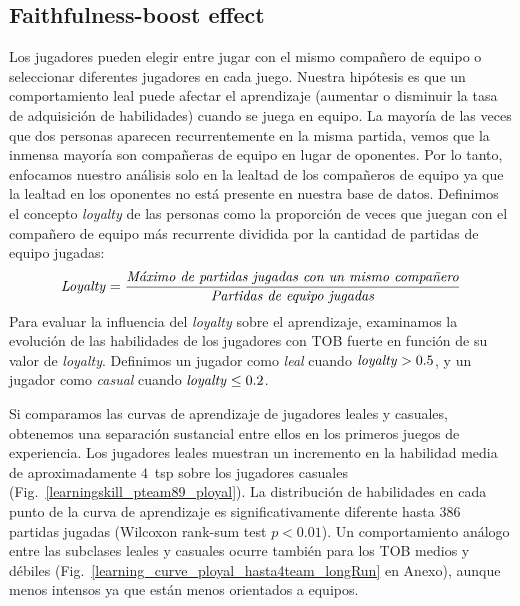 \documentclass[a4paper,11pt]{book}
\theoremstyle{definition}
\begin{document}
\subsection{Faithfulness-boost effect}

Los jugadores pueden elegir entre jugar con el mismo compa\~nero de equipo o seleccionar diferentes jugadores en cada juego.
%
Nuestra hip\'otesis es que un comportamiento leal puede afectar el aprendizaje (aumentar o disminuir la tasa de adquisici\'on de habilidades) cuando se juega en equipo.
%
La mayor\'ia de las veces que dos personas aparecen recurrentemente en la misma partida, vemos que la inmensa mayor\'ia son compa\~neras de equipo en lugar de oponentes.
%
Por lo tanto, enfocamos nuestro an\'alisis solo en la lealtad de los compa\~neros de equipo ya que la lealtad en los oponentes no est\'a presente en nuestra base de datos.
%
Definimos el concepto \emph{loyalty} de las personas como la proporci\'on de veces que juegan con el compa\~nero de equipo m\'as recurrente dividida por la cantidad de partidas de equipo jugadas:
%
\begin{equation}
\text{\emph{Loyalty}} = \frac{\text{\emph{M\'aximo de partidas jugadas con un mismo compa\~nero}}}{\text{\emph{Partidas de equipo jugadas}}}
\end{equation}
%
Para evaluar la influencia del \emph{loyalty} sobre el aprendizaje, examinamos la evoluci\'on de las habilidades de los jugadores con TOB fuerte en funci\'on de su valor de \emph{loyalty}.
%
Definimos un jugador como \emph{leal} cuando $\text{\emph{loyalty}}>0.5$, y un jugador como \emph{casual} cuando $\text{\emph{loyalty}}\leq 0.2$.


Si comparamos las curvas de aprendizaje de jugadores leales y casuales, obtenemos una separaci\'on sustancial entre ellos en los primeros juegos de experiencia.
%
Los jugadores leales muestran un incremento en la habilidad media de aproximadamente $4$~tsp sobre los jugadores casuales (Fig.~\ref{learningskill_pteam89_ployal}).
%
La distribuci\'on de habilidades en cada punto de la curva de aprendizaje es significativamente diferente hasta $386$ partidas jugadas (Wilcoxon rank-sum test $p<0.01$).
%
Un comportamiento an\'alogo entre las subclases leales y casuales ocurre tambi\'en para los TOB medios y d\'ebiles (Fig.~\ref{learning_curve_ployal_hasta4team_longRun} en Anexo), aunque menos intensos ya que est\'an menos orientados a equipos.

\end{document}
